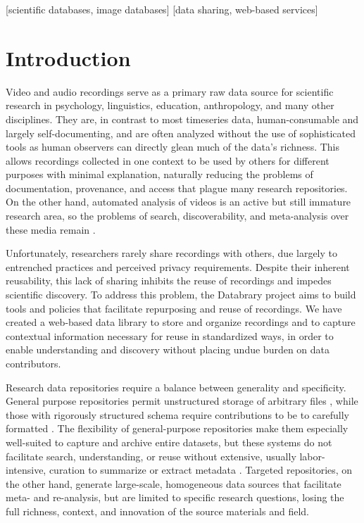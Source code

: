 \documentclass{sig-alternate}
\begin{document}
[scientific databases, image databases]
[data sharing, web-based services]



\section{Introduction}

Video and audio recordings serve as a primary raw data source for scientific research in psychology, linguistics, education, anthropology, and many other disciplines.
They are, in contrast to most timeseries data, human-consumable and largely self-documenting, and are often analyzed without the use of sophisticated tools as human observers can directly glean much of the data's richness.
This allows recordings collected in one context to be used by others for different purposes with minimal explanation, naturally reducing the problems of documentation, provenance, and access that plague many research repositories.
On the other hand, automated analysis of videos is an active but still immature research area, so the problems of search, discoverability, and meta-analysis over these media remain \cite{Albertson_2013, Lanagan_Smeaton_2012}.

Unfortunately, researchers rarely share recordings with others, due largely to entrenched practices and perceived privacy requirements.
Despite their inherent reusability, this lack of sharing inhibits the reuse of recordings and impedes scientific discovery.
To address this problem, the Databrary project aims to build tools and policies that facilitate repurposing and reuse of recordings.
We have created a web-based data library to store and organize recordings and to capture contextual information necessary for reuse in standardized ways, in order to enable understanding and discovery without placing undue burden on data contributors.

Research data repositories require a balance between generality and specificity.
General purpose repositories permit unstructured storage of arbitrary files \cite{dataverse, dryad, purr}, while those with rigorously structured schema require contributions to be to carefully formatted \cite{HCP, PGP, talkbank}.
The flexibility of general-purpose repositories make them especially well-suited to capture and archive entire datasets, but these systems do not facilitate search, understanding, or reuse without extensive, usually labor-intensive, curation to summarize or extract metadata \cite{Peer_2012}.
Targeted repositories, on the other hand, generate large-scale, homogeneous data sources that facilitate meta- and re-analysis, but are limited to specific research questions, losing the full richness, context, and innovation of the source materials and field.
\end{document}
